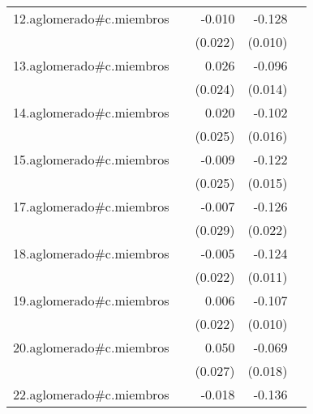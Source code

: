 {\begin{longtable}{l*{4}{D{.}{.}{-1}}}
\addlinespace
12.aglomerado#c.miembros&                     &      -0.010         &      -0.128\sym{***}&                     \\
            &                     &     (0.022)         &     (0.010)         &                     \\
\addlinespace
13.aglomerado#c.miembros&                     &       0.026         &      -0.096\sym{***}&                     \\
            &                     &     (0.024)         &     (0.014)         &                     \\
\addlinespace
14.aglomerado#c.miembros&                     &       0.020         &      -0.102\sym{***}&                     \\
            &                     &     (0.025)         &     (0.016)         &                     \\
\addlinespace
15.aglomerado#c.miembros&                     &      -0.009         &      -0.122\sym{***}&                     \\
            &                     &     (0.025)         &     (0.015)         &                     \\
\addlinespace
17.aglomerado#c.miembros&                     &      -0.007         &      -0.126\sym{***}&                     \\
            &                     &     (0.029)         &     (0.022)         &                     \\
\addlinespace
18.aglomerado#c.miembros&                     &      -0.005         &      -0.124\sym{***}&                     \\
            &                     &     (0.022)         &     (0.011)         &                     \\
\addlinespace
19.aglomerado#c.miembros&                     &       0.006         &      -0.107\sym{***}&                     \\
            &                     &     (0.022)         &     (0.010)         &                     \\
\addlinespace
20.aglomerado#c.miembros&                     &       0.050         &      -0.069\sym{***}&                     \\
            &                     &     (0.027)         &     (0.018)         &                     \\
\addlinespace
22.aglomerado#c.miembros&                     &      -0.018         &      -0.136\sym{***}&                     \\

\end{longtable}}
